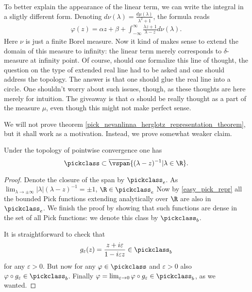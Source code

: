To better explain the appearance of the linear term, we can write the integral in a sligtly different form. Denoting $d \nu(\lambda) = \frac{d \mu(\lambda)}{\lambda^2 + 1}$, the formula reads
\begin{align*}
	\varphi(z) = \alpha z + \beta + \int_{-\infty}^{\infty} \frac{\lambda z + 1}{\lambda - z} d \nu(\lambda).
\end{align*}
Here $\nu$ is just a finite Borel measure. Now it kind of makes sense to extend the domain of this measure to infinity: the linear term merely corresponds to $\delta$-measure at infinity point. Of course, should one formalize this line of thought, the question on the type of extended real line had to be asked and one should address the topology. The answer is that one should glue the real line into a circle. One shouldn't worry about such issues, though, as these thoughts are here merely for intuition. The giveaway is that $\alpha$ should be really thought as a part of the measure $\mu$, even though this might not make perfect sense.

We will not prove theorem \ref{pick_nevanlinna_herglotz_representation_theorem}, but it shall work as a motivation. Instead, we prove somewhat weaker claim.
\begin{lem}\label{pick_dense}
	Under the topology of pointwise convergence one has
	\begin{align*}
		\pickclass \subset \overline{\vspan}\{(\lambda - z)^{-1} | \lambda \in \R\}.
	\end{align*}
\end{lem}
\begin{proof}
	Denote the closure of the span by $\pickclass_{e}$. As $\lim_{\lambda \to \pm \infty}|\lambda|(\lambda - z)^{-1} = \pm 1$, $\R \in \pickclass_{e}$ Now by \ref{easy_pick_repr} all the bounded Pick functions extending analytically over $\R$ are also in $\pickclass_{e}$. We finish the proof by showing that such functions are dense in the set of all Pick functions: we denote this class by $\pickclass_{b}$.

	It is straightforward to check that
	\begin{align*}
		g_{\varepsilon}(z) = \frac{z + i \varepsilon}{1 - i \varepsilon z} \in \pickclass_{b}
	\end{align*}
	for any $\varepsilon > 0$. But now for any $\varphi \in \pickclass$ and $\varepsilon > 0$ also $\varphi \circ g_{\varepsilon} \in \pickclass_{b}$. Finally $\varphi = \lim_{\varepsilon \to 0} \varphi \circ g_{\varepsilon} \in \pickclass_{b}$, as we wanted.
\end{proof}

